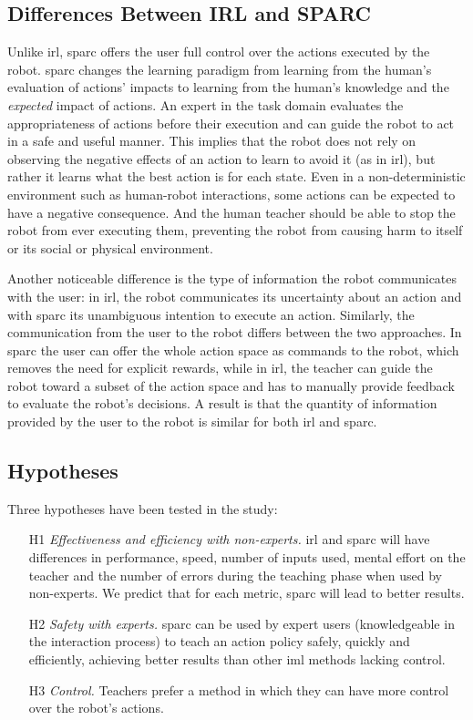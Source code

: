\subsection{Differences Between IRL and SPARC}

Unlike \gls{irl}, \gls{sparc} offers the user full control over the actions executed by the robot. \gls{sparc} changes the learning paradigm from learning from the human's evaluation of actions' impacts to learning from the human's knowledge and the \emph{expected} impact of actions. An expert in the task domain evaluates the appropriateness of actions before their execution and can guide the robot to act in a safe and useful manner. This implies that the robot does not rely on observing the negative effects of an action to learn to avoid it (as in \gls{irl}), but rather it learns what the best action is for each state. Even in a non-deterministic environment such as human-robot interactions, some actions can be expected to have a negative consequence. And the human teacher should be able to stop the robot from ever executing them, preventing the robot from causing harm to itself or its social or physical environment. 

Another noticeable difference is the type of information the robot communicates with the user: in \gls{irl}, the robot communicates its uncertainty about an action and with \gls{sparc} its unambiguous intention to execute an action. Similarly, the communication from the user to the  robot differs between the two approaches. In \gls{sparc} the user can offer the whole action space as commands to the robot, which removes the need for explicit rewards, while in \gls{irl}, the teacher can guide the robot toward a subset of the action space and has to manually provide feedback to evaluate the robot's decisions. A result is that the quantity of information provided by the user to the robot is similar for both \gls{irl} and \gls{sparc}. 

\subsection{Hypotheses}

Three hypotheses have been tested in the study:
\begin{enumerate}
	\item [H1] \textit{Effectiveness and efficiency with non-experts.} \gls{irl} and \gls{sparc} will have differences in performance, speed, number of inputs used, mental effort on the teacher and the number of errors during the teaching phase when used by non-experts. We predict that for each metric, \gls{sparc} will lead to better results.
	\item [H2] \textit{Safety with experts.} \gls{sparc} can be used by expert users (knowledgeable in the interaction process) to teach an action policy safely, quickly and efficiently, achieving better results than other \gls{iml} methods lacking control.
	\item [H3] \textit{Control.} Teachers prefer a method in which they can have more control over the robot's actions.
\end{enumerate}
